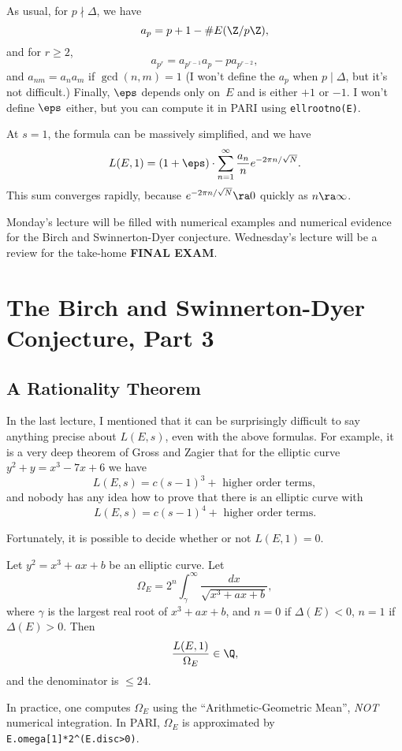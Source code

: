 \documentclass[11pt]{report}
\begin{document}
As usual, for $p\nmid \Delta$, we have
$$
  a_p = p+1 - \# E(\Z/p\Z),
$$
and for $r\geq 2$,
$$
  a_{p^r} = a_{p^{r-1}}a_p - p a_{p^{r-2}},
$$
and
$a_{nm} = a_n a_m$ if $\gcd(n,m)=1$
(I won't define the $a_p$ when $p\mid \Delta$, but it's
not difficult.)
Finally, $\eps$ depends only on~$E$ and is either $+1$ or $-1$.
I won't define $\eps$ either, but you can compute it in PARI
using {\tt ellrootno(E)}.

At $s=1$, the formula can be massively simplified, and we have
$$
  L(E,1) = (1+\eps) \cdot \sum_{n=1}^{\infty}
  \frac{a_n}{n} e^{-2\pi n/\sqrt{N}}.
$$
This sum converges rapidly, because
$e^{-2\pi n/\sqrt{N}}\ra 0$ quickly as $n\ra \infty$.


Monday's lecture will be filled with numerical examples and numerical
evidence for the Birch and Swinnerton-Dyer conjecture.   Wednesday's
lecture will be a review for the take-home {\bf FINAL EXAM}.






\chapter{The Birch and Swinnerton-Dyer Conjecture, Part 3}




\section{A Rationality Theorem}
In the last lecture, I mentioned that it can be surprisingly difficult to
say anything precise about $L(E,s)$, even with the above formulas.
For example, it is a very deep theorem of Gross and Zagier that for
the elliptic curve $y^2 + y = x^3 - 7x + 6$ we have
$$
  L(E,s) = c(s-1)^3 + \text{ higher order terms},
$$
and nobody has any idea how to prove that there is an elliptic curve
with
$$
  L(E,s) = c(s-1)^4 + \text{ higher order terms}.
$$

Fortunately, it is possible to decide whether or not $L(E,1)=0$.
\begin{theorem}
  Let $y^2 = x^3 + ax + b$ be an elliptic curve.
  Let
  $$
    \Omega_E = 2^n\int_{\gamma}^{\infty} \frac{dx}{\sqrt{x^3+ax+b}},
  $$
  where $\gamma$ is the largest real root of $x^3 +ax+b$, and
  $n=0$ if $\Delta(E)<0$, $n=1$ if $\Delta(E)>0$.
  Then
  $$
    \frac{L(E,1)}{\Omega_E} \in \Q,
  $$
  and the denominator is $\leq 24$.
\end{theorem}
In practice, one computes $\Omega_E$ using
the ``Arithmetic-Geometric Mean'', {\em NOT} numerical
integration.  In PARI, $\Omega_E$
is approximated by {\tt E.omega[1]*2\^{}(E.disc>0)}.
\end{document}
